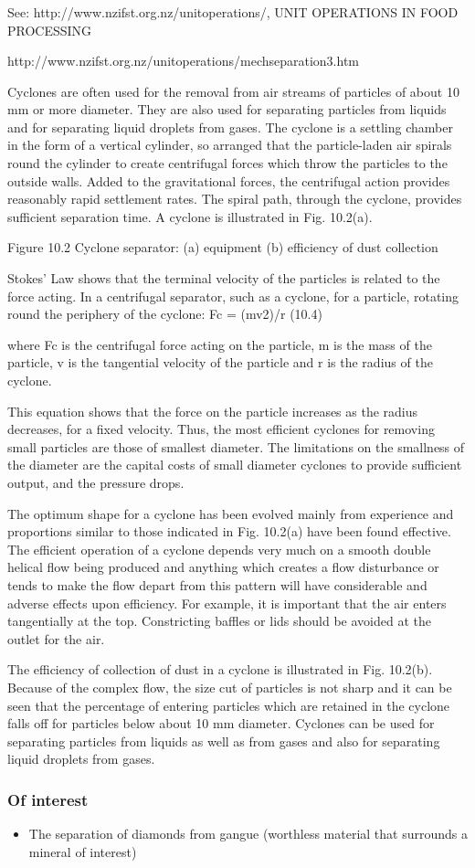 \begin{frame}\frametitle{}
	See: http://www.nzifst.org.nz/unitoperations/, UNIT OPERATIONS IN FOOD PROCESSING
	
	http://www.nzifst.org.nz/unitoperations/mechseparation3.htm

	Cyclones are often used for the removal from air streams of particles of about 10 mm or more diameter. They are also used for separating particles from liquids and for separating liquid droplets from gases. The cyclone is a settling chamber in the form of a vertical cylinder, so arranged that the particle-laden air spirals round the cylinder to create centrifugal forces which throw the particles to the outside walls. Added to the gravitational forces, the centrifugal action provides reasonably rapid settlement rates. The spiral path, through the cyclone, provides sufficient separation time. A cyclone is illustrated in Fig. 10.2(a).


	Figure 10.2 Cyclone separator: (a) equipment (b) efficiency of dust collection


	Stokes' Law shows that the terminal velocity of the particles is related to the force acting. In a centrifugal separator, such as a cyclone, for a particle, rotating round the periphery of the cyclone:
	           Fc = (mv2)/r                                                                                                         (10.4)

	where Fc is the centrifugal force acting on the particle, m is the mass of the particle, v is the tangential velocity of the particle and r is the radius of the cyclone.

	This equation shows that the force on the particle increases as the radius decreases, for a fixed velocity. Thus, the most efficient cyclones for removing small particles are those of smallest diameter. The limitations on the smallness of the diameter are the capital costs of small diameter cyclones to provide sufficient output, and the pressure drops.

	The optimum shape for a cyclone has been evolved mainly from experience and proportions similar to those indicated in Fig. 10.2(a) have been found effective. The efficient operation of a cyclone depends very much on a smooth double helical flow being produced and anything which creates a flow disturbance or tends to make the flow depart from this pattern will have considerable and adverse effects upon efficiency. For example, it is important that the air enters tangentially at the top. Constricting baffles or lids should be avoided at the outlet for the air.

	The efficiency of collection of dust in a cyclone is illustrated in Fig. 10.2(b). Because of the complex flow, the size cut of particles is not sharp and it can be seen that the percentage of entering particles which are retained in the cyclone falls off for particles below about 10 mm diameter. Cyclones can be used for separating particles from liquids as well as from gases and also for separating liquid droplets from gases.
\end{frame}


\begin{frame}\frametitle{Of interest}
	\begin{itemize}
		\item	The separation of diamonds from gangue (worthless material that surrounds a mineral of interest)
	\end{itemize}
\end{frame}